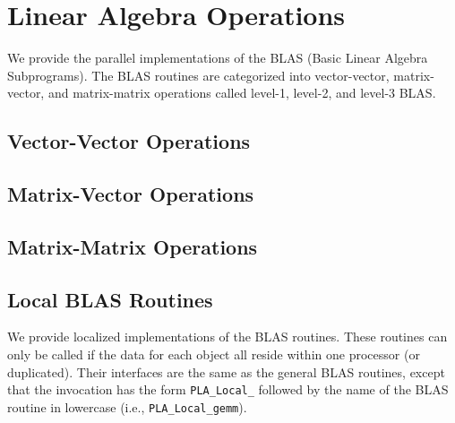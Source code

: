 \chapter{Linear Algebra Operations}
\label{chapter:blas}


We provide the parallel implementations of the BLAS
(Basic Linear Algebra Subprograms).  The BLAS routines
are categorized into vector-vector, matrix-vector, and
matrix-matrix operations called 
level-1, level-2, and level-3 BLAS.


\section{Vector-Vector Operations}





\section{Matrix-Vector Operations}





\section{Matrix-Matrix Operations}





\section{Local BLAS Routines}

We provide localized implementations of the BLAS routines.
These routines can only be called if the data for each object 
all reside within one processor (or duplicated).  
Their interfaces are the same as the general BLAS routines, 
except that the invocation has the form {\tt PLA\_Local\_} 
followed by the name of the BLAS routine in lowercase
(i.e., {\tt PLA\_Local\_gemm}).
